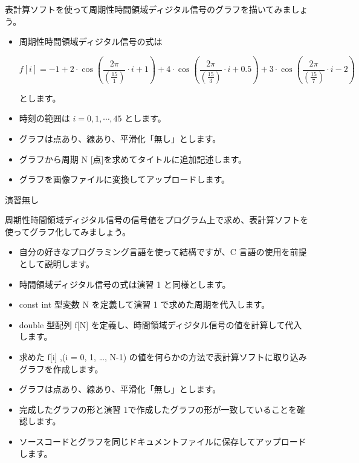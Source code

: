 \documentclass[a4paper]{jarticle}
\begin{document}



 表計算ソフトを使って周期性時間領域ディジタル信号のグラフを描いてみましょう。\par
\vspace{1zh}
\begin{itemize}
\item 周期性時間領域ディジタル信号の式は

\[
f[i] = 
-1
+ 2 \cdot \cos \left ( \frac{2 \pi}{ \left ( \frac{\textrm{15}}{1} \right ) } \cdot i + 1 \right )
+ 4 \cdot \cos \left ( \frac{2 \pi}{ \left ( \frac{\textrm{15}}{3} \right ) } \cdot i +0.5 \right )
+ 3 \cdot \cos \left ( \frac{2 \pi}{ \left ( \frac{\textrm{15}}{7} \right ) } \cdot i -2 \right )
\]

とします。
\item 時刻の範囲は $i = 0, 1,  \cdots, 45$ とします。
\item グラフは点あり、線あり、平滑化「無し」とします。
\item グラフから周期 $\textrm{N}$ [点]を求めてタイトルに追加記述します。
\item グラフを画像ファイルに変換してアップロードします。
\end{itemize}


\vspace{2zh}
\noindent 演習無し


 周期性時間領域ディジタル信号の信号値をプログラム上で求め、表計算ソフトを使ってグラフ化してみましょう。\par
\par\vspace{1zh}
\begin{itemize}
\item 自分の好きなプログラミング言語を使って結構ですが、C 言語の使用を前提として説明します。
\item 時間領域ディジタル信号の式は演習 1 と同様とします。
\item const int 型変数 N を定義して演習 1 で求めた周期を代入します。
\item double 型配列 f[N] を定義し、時間領域ディジタル信号の値を計算して代入します。
\item 求めた f[i] ,(i = 0, 1,  …, N-1) の値を何らかの方法で表計算ソフトに取り込みグラフを作成します。
\item グラフは点あり、線あり、平滑化「無し」とします。
\item 完成したグラフの形と演習 1で作成したグラフの形が一致していることを確認します。
\item ソースコードとグラフを同じドキュメントファイルに保存してアップロードします。
\end{itemize}
\end{document}
